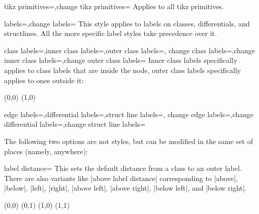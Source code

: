 \documentclass{ltxdoc}
\begin{document}
\begin{sseqdata}[name=ex1,degree={#1}{1-#1}]
\begin{keylist}{tikz primitives=,change tikz primitives=}
Applies to all tikz primitives.
\end{keylist}


\begin{keylist}{labels=,change labels=}
This style applies to labels on classes, differentials, and structlines. All the more specific label styles take precedence over it.
\end{keylist}

\begin{keylist}{class labels=,inner class labels=,outer class labels=,
                change class labels=,change inner class labels=,change outer class labels=}
Inner class labels specifically applies to class labels that are inside the node, outer class labels specifically applies to ones outside it:
\begin{codeexample}[]
\begin{sseqpage}[no axes, classes={inner sep=0.1cm},
    outer class labels={red},
    inner class labels={blue}]
\class["a", "b" above](0,0)
\class["a", "c" right](1,0)
\end{sseqpage}
\end{codeexample}
\end{keylist}

\begin{keylist}{edge labels=,differential labels=,struct line labels=,
                change edge labels=,change differential labels=,change struct line labels=}

\end{keylist}

The following two options are not styles, but can be modified in the same set of places (namely, anywhere):

\begin{keylist}{label distance=}
This sets the default distance from a class to an outer label. There are also variants like |above label distance| corresponding to |above|, |below|, |left|, |right|, |above left|, |above right|, |below left|, and |below right|.
\begin{codeexample}[width=6cm]
\begin{sseqpage}[label distance=0.3em, right label distance=0em]
\class["a" above](0,0)
(0,1)
\class["c" right](1,0)
\class["c" {right=1em}](1,1)
\end{sseqpage}
\end{codeexample}
\end{keylist}


\end{sseqdata}
\end{document}
